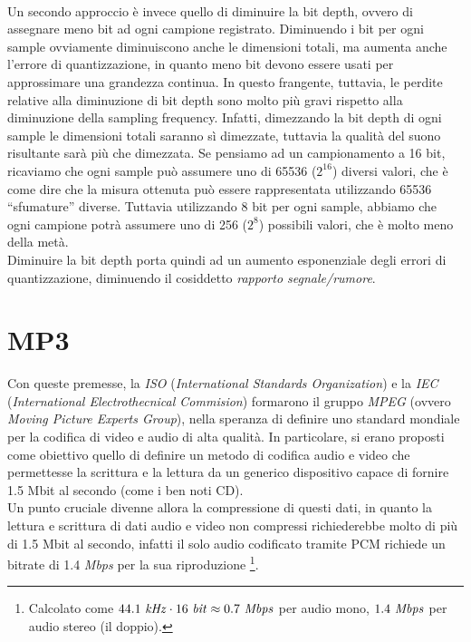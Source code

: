 			\\
			Un secondo approccio è invece quello di diminuire la bit depth, ovvero di assegnare meno bit ad ogni campione registrato. Diminuendo i bit per ogni sample ovviamente diminuiscono anche le dimensioni totali, ma aumenta anche l'errore di quantizzazione, in quanto meno bit devono essere usati per approssimare una grandezza continua. In questo frangente, tuttavia, le perdite relative alla diminuzione di bit depth sono molto più gravi rispetto alla diminuzione della sampling frequency. Infatti, dimezzando la bit depth di ogni sample le dimensioni totali saranno sì dimezzate, tuttavia la qualità del suono risultante sarà più che dimezzata. Se pensiamo ad un campionamento a 16 bit, ricaviamo che ogni sample può assumere uno di 65536 ($2^{16}$) diversi valori, che è come dire che la misura ottenuta può essere rappresentata utilizzando 65536 ``sfumature'' diverse. Tuttavia utilizzando 8 bit per ogni sample, abbiamo che ogni campione potrà assumere uno di 256 ($2^8$) possibili valori, che è molto meno della metà.\\
			Diminuire la bit depth porta quindi ad un aumento esponenziale degli errori di quantizzazione, diminuendo il cosiddetto \textit{rapporto segnale/rumore}.
			
	\section{MP3}
		Con queste premesse, la \textit{ISO} (\textit{International Standards Organization}) e la \textit{IEC} (\textit{International Electrothecnical Commision}) formarono il gruppo \textit{MPEG} (ovvero \textit{Moving Picture Experts Group}), nella speranza di definire uno standard mondiale per la codifica di video e audio di alta qualità. In particolare, si erano proposti come obiettivo quello di definire un metodo di codifica audio e video che permettesse la scrittura e la lettura da un generico dispositivo capace di fornire 1.5 Mbit al secondo (come i ben noti CD).\\
		Un punto cruciale divenne allora la compressione di questi dati, in quanto la lettura e scrittura di dati audio e video non compressi richiederebbe molto di più di 1.5 Mbit al secondo, infatti il solo audio codificato tramite PCM richiede un bitrate di 1.4 \textit{Mbps} per la sua riproduzione \footnote{Calcolato come $44.1\mbox{ \textit{kHz}}\cdot 16\mbox{ \textit{bit}}\approx 0.7\mbox{ \textit{Mbps}}$ per audio mono, $1.4\mbox{ \textit{Mbps}}$ per audio stereo (il doppio).}.
		
